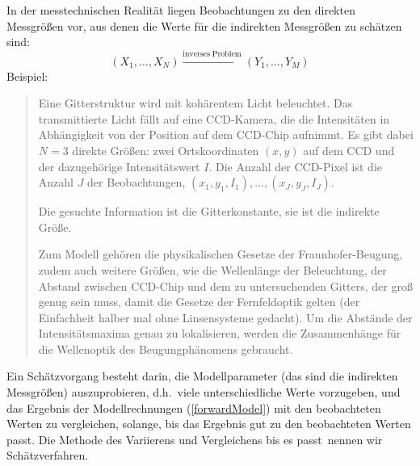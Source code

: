 In der messtechnischen Realität liegen Beobachtungen zu den direkten Messgrößen vor, aus denen die Werte für die
indirekten Messgrößen zu schätzen sind:
\begin{equation}
(X_1, \dots, X_N) \xrightarrow{\mathrm{inverses \; Problem}} (Y_1, \dots, Y_M)
\label{inverseProblem}
\end{equation}
Beispiel:
\begin{quote}
Eine Gitterstruktur wird mit kohärentem Licht beleuchtet. Das transmittierte Licht fällt auf eine CCD-Kamera, die
die Intensitäten in Abhängigkeit von der Position auf dem CCD-Chip aufnimmt. Es gibt dabei $N = 3$ direkte Größen:
zwei Ortskoordinaten $(x, y)$ auf dem CCD und der dazugehörige Intensitätswert $I$. Die Anzahl der CCD-Pixel ist die
Anzahl $J$ der Beobachtungen, $(x_1, y_1, I_1), \dots, (x_J, y_J, I_J)$.

Die gesuchte Information ist die Gitterkonstante, sie ist die indirekte Größe.

Zum Modell gehören die physikalischen Gesetze der Fraunhofer-Beugung, zudem auch weitere Größen, wie die Wellenlänge
der Beleuchtung, der Abstand zwischen CCD-Chip und dem zu untersuchenden Gitters, der groß genug sein muss, damit die
Gesetze der Fernfeldoptik gelten (der Einfachheit halber mal ohne Linsensysteme gedacht). Um die Abstände der Intensitätsmaxima
genau zu lokalisieren, werden die Zusammenhänge für die Wellenoptik des Beugungphänomens gebraucht.
\end{quote}

Ein Schätzvorgang besteht darin, die Modellparameter (das sind die indirekten Messgrößen) auszuprobieren, d.h.\
viele unterschiedliche Werte vorzugeben, und
das Ergebnis der Modellrechnungen (\ref{forwardModel}) mit den beobachteten Werten zu vergleichen, solange,
bis das Ergebnis \glqq gut zu den beobachteten Werten passt\grqq. Die Methode des Variierens und Vergleichens \glqq bis
es passt\grqq ~nennen wir Schätzverfahren.


